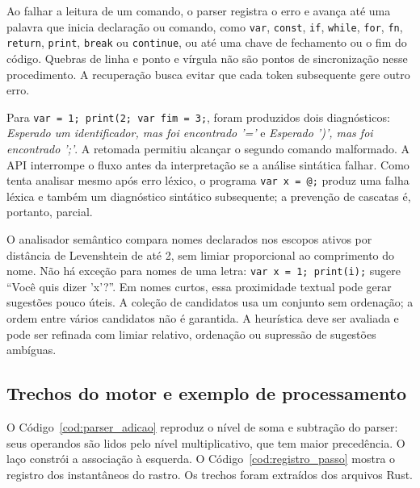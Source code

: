 Ao falhar a leitura de um comando, o parser registra o erro e avança até uma
palavra que inicia declaração ou comando, como \texttt{var}, \texttt{const},
\texttt{if}, \texttt{while}, \texttt{for}, \texttt{fn}, \texttt{return},
\texttt{print}, \texttt{break} ou \texttt{continue}, ou até uma chave de
fechamento ou o fim do código. Quebras de linha e ponto e vírgula não são pontos
de sincronização nesse procedimento. A recuperação busca evitar que cada token subsequente gere outro erro.

Para \texttt{var = 1; print(2; var fim = 3;}, foram produzidos dois diagnósticos:
\textit{Esperado um identificador, mas foi encontrado '='} e
\textit{Esperado ')', mas foi encontrado ';'}. A retomada permitiu alcançar o segundo comando malformado.
A API interrompe o fluxo antes da interpretação se a análise sintática falhar.
Como tenta analisar mesmo após erro léxico, o programa \texttt{var x = @;}
produz uma falha léxica e também um diagnóstico sintático subsequente; a prevenção
de cascatas é, portanto, parcial.

O analisador semântico compara nomes declarados nos escopos ativos por distância
de Levenshtein de até 2, sem limiar proporcional ao comprimento do nome. Não há
exceção para nomes de uma letra: \texttt{var x = 1; print(i);} sugere
``Você quis dizer 'x'?''. Em nomes curtos, essa proximidade textual pode gerar sugestões pouco úteis. A coleção de
candidatos usa um conjunto sem ordenação; a ordem entre vários candidatos não
é garantida. A heurística deve ser avaliada e pode ser refinada com limiar
relativo, ordenação ou supressão de sugestões ambíguas.

\subsection{Trechos do motor e exemplo de processamento}
\label{sec:exemplo_pipeline}

O Código~\ref{cod:parser_adicao} reproduz o nível de soma e subtração do parser:
seus operandos são lidos pelo nível multiplicativo, que tem maior precedência.
O laço constrói a associação à esquerda. O Código~\ref{cod:registro_passo}
mostra o registro dos instantâneos do rastro. Os trechos foram extraídos dos arquivos Rust.

\begin{codigo}[htb]

\end{codigo}
\FloatBarrier

